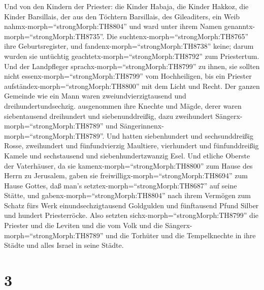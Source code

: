  Und von den Kindern der Priester: die Kinder Habaja, die
Kinder Hakkoz, die Kinder Barsillais, der aus den Töchtern Barsillais,
des Gileaditers, ein Weib nahmx-morph=``strongMorph:TH8804'' und ward
unter ihrem Namen genanntx-morph=``strongMorph:TH8735''. 
Die suchtenx-morph=``strongMorph:TH8765'' ihre Geburtsregister, und
fandenx-morph=``strongMorph:TH8738'' keine; darum wurden sie untüchtig
geachtetx-morph=``strongMorph:TH8792'' zum Priestertum. 
Und der Landpfleger sprachx-morph=``strongMorph:TH8799'' zu ihnen, sie
sollten nicht essenx-morph=``strongMorph:TH8799'' vom Hochheiligen, bis
ein Priester aufständex-morph=``strongMorph:TH8800'' mit dem Licht und
Recht.  Der ganzen Gemeinde wie ein Mann waren
zweiundvierzigtausend und dreihundertundsechzig. 
ausgenommen ihre Knechte und Mägde, derer waren siebentausend
dreihundert und siebenunddreißig, dazu zweihundert
Sängerx-morph=``strongMorph:TH8789'' und
Sängerinnenx-morph=``strongMorph:TH8789''.  Und hatten
siebenhundert und sechsunddreißig Rosse, zweihundert und fünfundvierzig
Maultiere,  vierhundert und fünfunddreißig Kamele und
sechstausend und siebenhundertzwanzig Esel.  Und etliche
Oberste der Vaterhäuser, da sie kamenx-morph=``strongMorph:TH8800'' zum
Hause des Herrn zu Jerusalem, gaben sie
freiwilligx-morph=``strongMorph:TH8694'' zum Hause Gottes, daß man's
setztex-morph=``strongMorph:TH8687'' auf seine Stätte,  und
gabenx-morph=``strongMorph:TH8804'' nach ihrem Vermögen zum Schatz fürs
Werk einundsechzigtausend Goldgulden und fünftausend Pfund Silber und
hundert Priesterröcke.  Also setzten
sichx-morph=``strongMorph:TH8799'' die Priester und die Leviten und die
vom Volk und die Sängerx-morph=``strongMorph:TH8789'' und die Torhüter
und die Tempelknechte in ihre Städte und alles Israel in seine Städte.

\hypertarget{section-2}{%
\section{3}\label{section-2}}

